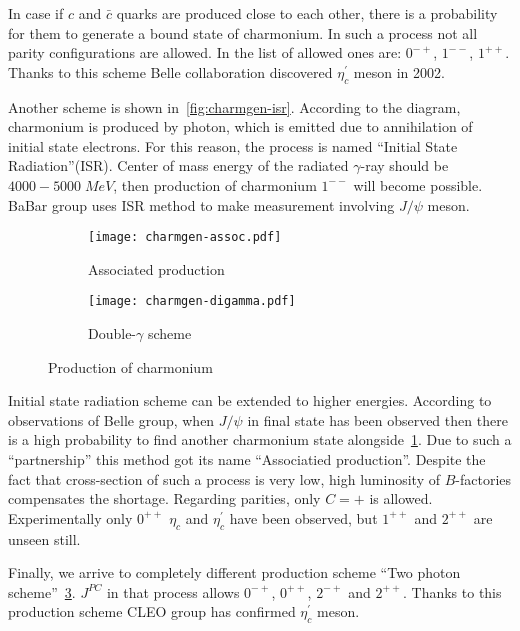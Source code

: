 In case if $c$ and $\bar{c}$ quarks are produced close to each other, there is a probability for them to generate a bound state of charmonium. In such a process not all parity configurations are allowed. In the list of allowed ones are: $0^{-+}$, $1^{--}$, $1^{++}$. Thanks to this scheme Belle collaboration discovered $\eta^\prime_c$ meson in 2002.~\cite{bdecay-etacprime}

Another scheme is shown in~\cref{fig:charmgen-isr}. According to the diagram, charmonium is produced by photon, which is emitted due to annihilation of initial state electrons. For this reason, the process is named ``Initial State Radiation''(ISR). Center of mass energy of the radiated $\gamma$-ray should be $4000-5000\;MeV$, then production of charmonium $1^{--}$ will become possible. BaBar group uses ISR method to make measurement involving $J/\psi$ meson.~\cite{isr-jpsi}

\begin{figure}[H]
    \centering
    \begin{subfigure}[b]{0.4\textwidth}
        \texttt{[image: charmgen-assoc.pdf]}
        \caption{Associated production} \label{fig:charmgen-assoc}
    \end{subfigure}
    \begin{subfigure}[b]{0.4\textwidth}
        \texttt{[image: charmgen-digamma.pdf]}
        \caption{Double-$\gamma$ scheme} \label{fig:charmgen-digamma}
    \end{subfigure}
    \caption{Production of charmonium}
\end{figure}

Initial state radiation scheme can be extended to higher energies. According to observations of Belle group, when $J/\psi$ in final state has been observed then there is a high probability to find another charmonium state alongside~\cref{fig:charmgen-assoc}. Due to such a ``partnership'' this method got its name ``Associatied production''. Despite the fact that cross-section of such a process is very low, high luminosity of $B$-factories compensates  the shortage. Regarding parities, only $C=+$ is allowed. Experimentally only $0^{++}$ $\eta_c$ and $\eta_c^\prime$ have been observed, but $1^{++}$ and $2^{++}$ are unseen still.~\cite{assoc-prod}

Finally, we arrive to completely different production scheme ``Two photon scheme''~\cref{fig:charmgen-digamma}. $J^{PC}$ in that process allows $0^{-+}$, $0^{++}$, $2^{-+}$ and $2^{++}$. Thanks to this production scheme CLEO group has confirmed $\eta_c^\prime$ meson.~\cite{digamma}

